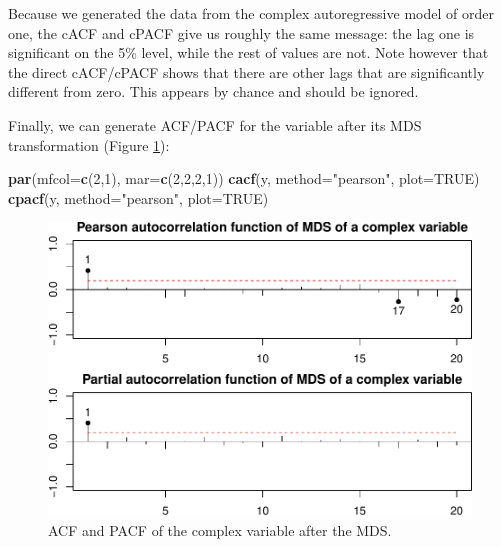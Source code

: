 \documentclass[
]{book}
\newenvironment{Shaded}{\begin{snugshade}}{\end{snugshade}}
\newcommand{\DataTypeTok}[1]{\textcolor[rgb]{0.13,0.29,0.53}{#1}}
\newcommand{\DecValTok}[1]{\textcolor[rgb]{0.00,0.00,0.81}{#1}}
\newcommand{\KeywordTok}[1]{\textcolor[rgb]{0.13,0.29,0.53}{\textbf{#1}}}
\newcommand{\NormalTok}[1]{#1}
\newcommand{\OtherTok}[1]{\textcolor[rgb]{0.56,0.35,0.01}{#1}}
\newcommand{\StringTok}[1]{\textcolor[rgb]{0.31,0.60,0.02}{#1}}
\begin{document}
Because we generated the data from the complex autoregressive model of order one, the cACF and cPACF give us roughly the same message: the lag one is significant on the 5\% level, while the rest of values are not. Note however that the direct cACF/cPACF shows that there are other lags that are significantly different from zero. This appears by chance and should be ignored.

Finally, we can generate ACF/PACF for the variable after its MDS transformation (Figure \ref{fig:complexAR1Pearson}):

\begin{Shaded}
\begin{Highlighting}[]
\KeywordTok{par}\NormalTok{(}\DataTypeTok{mfcol=}\KeywordTok{c}\NormalTok{(}\DecValTok{2}\NormalTok{,}\DecValTok{1}\NormalTok{), }\DataTypeTok{mar=}\KeywordTok{c}\NormalTok{(}\DecValTok{2}\NormalTok{,}\DecValTok{2}\NormalTok{,}\DecValTok{2}\NormalTok{,}\DecValTok{1}\NormalTok{))}
\KeywordTok{cacf}\NormalTok{(y, }\DataTypeTok{method=}\StringTok{"pearson"}\NormalTok{, }\DataTypeTok{plot=}\OtherTok{TRUE}\NormalTok{)}
\KeywordTok{cpacf}\NormalTok{(y, }\DataTypeTok{method=}\StringTok{"pearson"}\NormalTok{, }\DataTypeTok{plot=}\OtherTok{TRUE}\NormalTok{)}
\end{Highlighting}
\end{Shaded}

\begin{figure}
\centering
\includegraphics{Svetunkov---Svetunkov---Complex-Valued-Econometrics_files/figure-latex/complexAR1Pearson-1.pdf}
\caption{\label{fig:complexAR1Pearson}ACF and PACF of the complex variable after the MDS.}
\end{figure}
\end{document}
